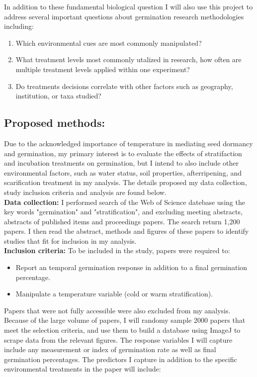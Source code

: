 \documentclass{article}\usepackage[]{graphicx}\usepackage[]{color}
\begin{document}
\indent In addition to these fundamental biological question I will also use this project to address several important questions about germination research methodologies including:
\begin{enumerate}
\item Which environmental cues are most commonly manipulated?
\item What treatment levels most commonly utalized in research, how often are multiple treatment levels applied within one experiment?
\item Do treatments decisions correlate with other factors such as geography, institution, or taxa studied?
\end{enumerate}
\subsection*{Proposed methods:}
\indent Due to the acknowledged importance of temperature in mediating seed dormancy and germination, my primary interest is to evaluate the effects of stratifaction and incubation treatments on germination, but I intend to also include other environmental factors, such as water status, soil properties, afterripening, and scarification treatment in my analysis. The details proposed my data collection, study inclusion criteria and analysis are found below.\\
\textbf{Data collection:} I performed search of the Web of Science datebase using the key words "germination" and "stratification", and excluding meeting abstracts, abstracts of published items and proceedings papers. The search return 1,200 papers. I then read the abstract, methods and figures of these papers to identify studies that fit for inclusion in my analysis.\\
\textbf{Inclusion criteria:} To be included in the study, papers were required to:
\begin{itemize}
\item Report an temporal germination response in addition to a final germination percentage.
\item Manipulate a temperature variable (cold or warm stratification).
\end{itemize}
\indent Papers that were not fully accessible were also excluded from my analysis. Because of the large volume of papers, I will randomy sample 2000 papers that meet the selection criteria, and use them to build a database using ImageJ to scrape data from the relevant figures. The response variables I will capture include any measurement or index of germination rate as well as final germination percentages. The predictors I capture in addition to the specific environmental treatments in the paper will include:
\end{document}
